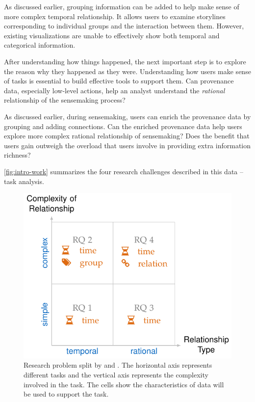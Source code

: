 \begin{enumerate}
	As discussed earlier, grouping information can be added to help make sense of more complex temporal relationship. It allows users to examine storylines corresponding to individual groups and the interaction between them. However, existing visualizations are unable to effectively show both temporal and categorical information.
	
	After understanding how things happened, the next important step is	to explore the reason why they happened as they were. Understanding how users make sense of tasks is essential to build effective tools to support them. Can provenance data, especially low-level actions, help an analyst understand the \emph{rational} relationship of the sensemaking process?
	
	As discussed earlier, during sensemaking, users can enrich the provenance data by grouping and adding connections. Can the enriched provenance data help users explore more complex rational relationship of sensemaking? Does the benefit that users gain outweigh the overload that users involve in providing extra information richness?
\end{enumerate}

\autoref{fig:intro-work} summarizes the four research challenges described in this data -- task analysis.

\begin{figure}[!htb]
	\centering
	\includegraphics{work}
	\caption{Research problem split by  and . The horizontal axis represents different tasks and the vertical axis represents the complexity involved in the  task. The cells show the characteristics of data will be used to support the task.}
	\label{fig:intro-work}
\end{figure}

